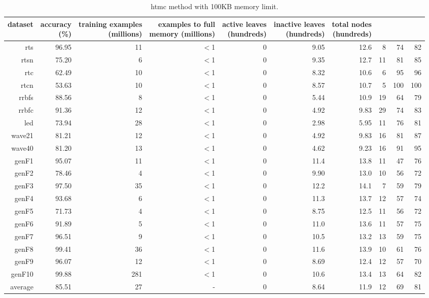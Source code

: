 \begin{table}
\caption{{\sc htmc} method with 100KB memory limit.}
\label{tab:htmc-100k}
\centering
\begin{tabular}{|r|r|r|r|r|r|r|r|r|r|}
\hline
dataset	&
\rotatebox{90}{\parbox{9em}{accuracy\\(\%)}} &
\rotatebox{90}{\parbox{9em}{training examples\\(millions)}} &
\rotatebox{90}{\parbox{9em}{examples to full\\memory (millions)}} &
\rotatebox{90}{\parbox{9em}{active leaves\\(hundreds)}} &
\rotatebox{90}{\parbox{9em}{inactive leaves\\(hundreds)}} &
\rotatebox{90}{\parbox{9em}{total nodes\\(hundreds)}} &
\rotatebox{90}{\parbox{9em}{tree depth}}	&
\rotatebox{90}{\parbox{9em}{training speed (\%)}} &
\rotatebox{90}{\parbox{9em}{prediction speed (\%)}} \\
\hline
{\sc rts} & 96.95 & 11 & $<$1 & 0 & 9.05 & 12.6 & 8 & 74 & 82 \\
{\sc rtsn} & 75.20 & 6 & $<$1 & 0 & 9.35 & 12.7 & 11 & 81 & 85 \\
{\sc rtc} & 62.49 & 10 & $<$1 & 0 & 8.32 & 10.6 & 6 & 95 & 96 \\
{\sc rtcn} & 53.63 & 10 & $<$1 & 0 & 8.57 & 10.7 & 5 & 100 & 100 \\
{\sc rrbfs} & 88.56 & 8 & $<$1 & 0 & 5.44 & 10.9 & 19 & 64 & 79 \\
{\sc rrbfc} & 91.36 & 12 & $<$1 & 0 & 4.92 & 9.83 & 29 & 74 & 83 \\
{\sc led} & 73.94 & 28 & $<$1 & 0 & 2.98 & 5.95 & 11 & 76 & 81 \\
{\sc wave21} & 81.21 & 12 & $<$1 & 0 & 4.92 & 9.83 & 16 & 81 & 87 \\
{\sc wave40} & 81.20 & 13 & $<$1 & 0 & 4.62 & 9.23 & 16 & 91 & 95 \\
{\sc genF1} & 95.07 & 11 & $<$1 & 0 & 11.4 & 13.8 & 11 & 47 & 76 \\
{\sc genF2} & 78.46 & 4 & $<$1 & 0 & 9.90 & 13.0 & 10 & 56 & 72 \\
{\sc genF3} & 97.50 & 35 & $<$1 & 0 & 12.2 & 14.1 & 7 & 59 & 79 \\
{\sc genF4} & 93.68 & 6 & $<$1 & 0 & 11.3 & 13.7 & 12 & 57 & 74 \\
{\sc genF5} & 71.73 & 4 & $<$1 & 0 & 8.75 & 12.5 & 11 & 56 & 72 \\
{\sc genF6} & 91.89 & 5 & $<$1 & 0 & 11.0 & 13.6 & 11 & 57 & 75 \\
{\sc genF7} & 96.51 & 9 & $<$1 & 0 & 10.5 & 13.2 & 13 & 59 & 75 \\
{\sc genF8} & 99.41 & 36 & $<$1 & 0 & 11.6 & 13.9 & 10 & 61 & 76 \\
{\sc genF9} & 96.07 & 12 & $<$1 & 0 & 8.69 & 12.4 & 12 & 57 & 70 \\
{\sc genF10} & 99.88 & 281 & $<$1 & 0 & 10.6 & 13.4 & 13 & 64 & 82 \\
\hline
average & 85.51 & 27 &  -  & 0 & 8.64 & 11.9 & 12 & 69 & 81 \\
\hline
\end{tabular}
\end{table}
